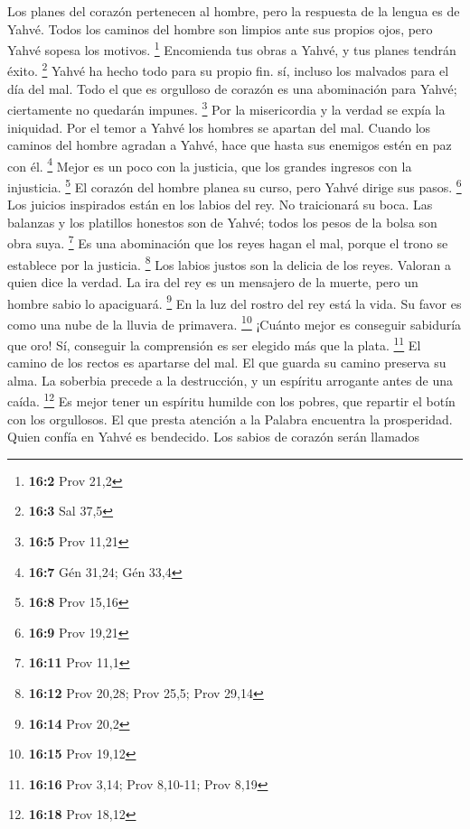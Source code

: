  Los planes del corazón pertenecen al hombre, pero la
respuesta de la lengua es de Yahvé.  Todos los caminos del
hombre son limpios ante sus propios ojos, pero Yahvé sopesa los motivos.
\footnote{\textbf{16:2} Prov 21,2}  Encomienda tus obras a
Yahvé, y tus planes tendrán éxito. \footnote{\textbf{16:3} Sal 37,5}
 Yahvé ha hecho todo para su propio fin. sí, incluso los
malvados para el día del mal.  Todo el que es orgulloso de
corazón es una abominación para Yahvé; ciertamente no quedarán impunes.
\footnote{\textbf{16:5} Prov 11,21}  Por la misericordia y
la verdad se expía la iniquidad. Por el temor a Yahvé los hombres se
apartan del mal.  Cuando los caminos del hombre agradan a
Yahvé, hace que hasta sus enemigos estén en paz con él. \footnote{\textbf{16:7}
  Gén 31,24; Gén 33,4}  Mejor es un poco con la justicia,
que los grandes ingresos con la injusticia. \footnote{\textbf{16:8} Prov
  15,16}  El corazón del hombre planea su curso, pero
Yahvé dirige sus pasos. \footnote{\textbf{16:9} Prov 19,21}
 Los juicios inspirados están en los labios del rey. No
traicionará su boca.  Las balanzas y los platillos
honestos son de Yahvé; todos los pesos de la bolsa son obra suya.
\footnote{\textbf{16:11} Prov 11,1}  Es una abominación
que los reyes hagan el mal, porque el trono se establece por la
justicia. \footnote{\textbf{16:12} Prov 20,28; Prov 25,5; Prov 29,14}
 Los labios justos son la delicia de los reyes. Valoran a
quien dice la verdad.  La ira del rey es un mensajero de
la muerte, pero un hombre sabio lo apaciguará. \footnote{\textbf{16:14}
  Prov 20,2}  En la luz del rostro del rey está la vida.
Su favor es como una nube de la lluvia de primavera. \footnote{\textbf{16:15}
  Prov 19,12}  ¡Cuánto mejor es conseguir sabiduría que
oro! Sí, conseguir la comprensión es ser elegido más que la plata.
\footnote{\textbf{16:16} Prov 3,14; Prov 8,10-11; Prov 8,19}
 El camino de los rectos es apartarse del mal. El que
guarda su camino preserva su alma.  La soberbia precede a
la destrucción, y un espíritu arrogante antes de una caída. \footnote{\textbf{16:18}
  Prov 18,12}  Es mejor tener un espíritu humilde con los
pobres, que repartir el botín con los orgullosos.  El que
presta atención a la Palabra encuentra la prosperidad. Quien confía en
Yahvé es bendecido.  Los sabios de corazón serán llamados
